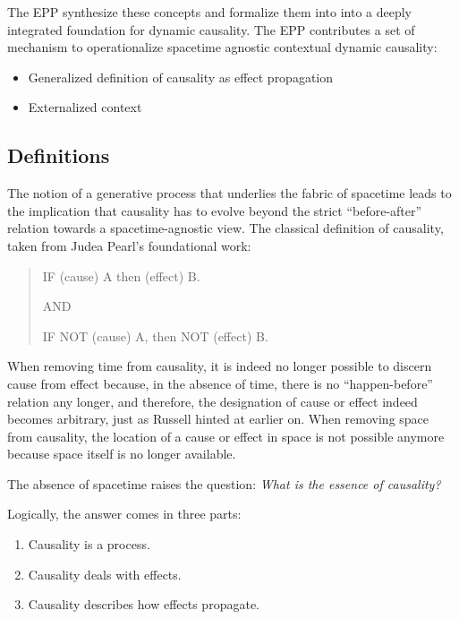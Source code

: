 The EPP synthesize these concepts and formalize them into  into a deeply integrated foundation for
dynamic causality. The EPP contributes a set of mechanism to operationalize spacetime agnostic contextual dynamic causality:

\begin{itemize}
	\item Generalized definition of causality as effect propagation 
	\item Externalized context
	\ 
\end{itemize}  


\subsection{Definitions}
\label{sec:epp_definition}

The notion of a generative process that underlies the fabric of spacetime leads to the implication that causality has to evolve beyond the strict “before-after” relation towards a spacetime-agnostic view. The classical definition of causality, taken from Judea Pearl's foundational work\cite{pearl2000causality}: 

\begin{quote}
    IF (cause) A then (effect) B.
    
    AND 
    
    IF NOT (cause) A, then NOT (effect) B.
\end{quote}

When removing time from causality, it is indeed no longer possible to discern cause from effect because, in the absence of time, there is no “happen-before” relation any longer, and therefore, the designation of cause or effect indeed becomes arbitrary, just as Russell hinted at earlier on. When removing space from causality, the location of a cause or effect in space is not possible anymore because space itself is no longer available. 

\newpage

The absence of spacetime raises the question: \textit{What is the essence of causality?}

Logically, the answer comes in three parts:

\begin{enumerate}
    \item Causality is a process.
    \item Causality deals with effects.
    \item Causality describes how effects propagate.
\end{enumerate}

